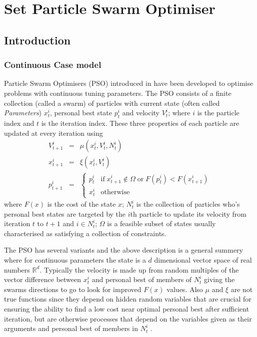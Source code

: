 \documentclass[a4paper,oneside,english]{book}
\numberwithin{equation}{section}
\numberwithin{figure}{section}
\begin{document}
	\chapter{Set Particle Swarm Optimiser}
\section{Introduction}
\subsection{Continuous Case model}
Particle Swarm Optimisers (PSO) introduced in \cite{KE-pso} have been developed to optimise problems with continuous tuning parameters. The PSO consists of a finite collection (called a swarm) of particles with current state (often called \textit{Parameters}) $x_t^i$, personal best state $p_t^i$ and velocity $V_t^i$; where $i$ is the particle index and $t$ is the iteration index. These three properties of each particle are updated at every iteration using 
\begin{align}
V_{t+1}^i&=&\mu \left(x_t^i,V_t^i,N_t^i\right)\\
x_{t+1}^i&=&\xi \left(x_t^i,V_t^i\right)\\
p_{t+1}^i&=&\left\lbrace \begin{array}{cc}
p_t^i& \mathrm{if}\; x_{t+1}^i\notin \varOmega \;\mathrm{or}\; F(p_t^i)<F(x_{t+1}^i)  \\ 
x_t^i&\mathrm{otherwise} 
\end{array}\right. 
\end{align} 
where $F(x)$ is the cost of the state $x$; $N_t^i$ is the  collection of particles who's  personal best states are targeted by the $i$th particle to update its velocity from iteration $t$ to $t+1$ and  $ i \in N_t^i $; $\varOmega$ is a feasible  subset of states usually characterised as satisfying a collection of constraints.

The PSO has several variants and the above description is a general summery where for continuous parameters the state is a $d$ dimensional vector space of real numbers $\mathbb{R}^d$. Typically the velocity is made up from random multiples of the vector difference between $x_t^i$ and personal best of members of $N_t^i$ giving the swarms directions to go to look for improved $F(x)$ values. Also $\mu$ and $\xi$ are not true functions since they depend on hidden random variables that are crucial for ensuring the ability to find a low cost near optimal personal best after sufficient iteration, but are otherwise processes that depend on the variables given as their arguments and personal best of members in $N_t^i$ .
 
\end{document}
